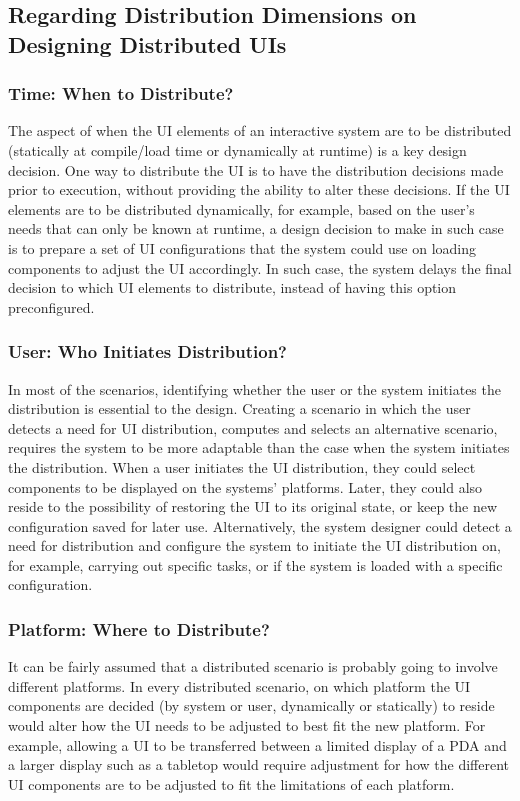\subsection{Regarding Distribution Dimensions on Designing Distributed UIs} 
\subsubsection{Time: When to Distribute?}
The aspect of when the UI elements of an interactive system are to be distributed (statically at compile/load time or dynamically at runtime) is a key design decision. One way to distribute the UI is to have the distribution decisions made prior to execution, without providing the ability to alter these decisions. If the UI elements are to be distributed dynamically, for example, based on the user's needs that can only be known at runtime, a design decision to make in such case is to prepare a set of UI configurations that the system could use on loading components to adjust the UI accordingly. In such case, the system delays the final decision to which UI elements to distribute, instead of having this option preconfigured.    

\subsubsection{User: Who Initiates Distribution?}
In most of the scenarios, identifying whether the user or the system initiates the distribution is essential to the design. Creating a scenario in which the user detects a need for UI distribution, computes and selects an alternative scenario, requires the system to be more adaptable than the case when the system initiates the distribution. When a user initiates the UI distribution, they could select components to be displayed on the systems' platforms. Later, they could also reside to the possibility of restoring the UI to its original state, or keep the new configuration saved for later use. Alternatively, the system designer could detect a need for distribution and configure the system to initiate the UI distribution on, for example, carrying out specific tasks, or if the system is loaded with a specific configuration.    
 
\subsubsection{Platform: Where to Distribute?}
It can be fairly assumed that a distributed scenario is probably going to
involve different platforms. In every distributed scenario, on which platform the UI components are decided (by system or user, dynamically or statically) to reside would alter how the UI needs to be adjusted to best fit the new platform. For example, allowing a UI to be transferred between a limited display of a PDA and a larger display such as a tabletop would require adjustment for how the different UI components are to be adjusted to fit the limitations of each platform.

